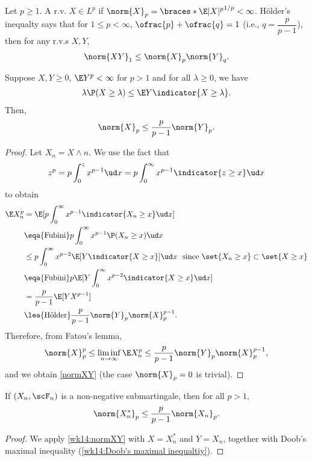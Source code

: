 \documentclass[../aipt.tex]{subfiles}
\begin{document}
Let $p\geq 1$. A r.v. $X \in L^p$ if $\norm{X}_p = \braces*{\E |X|^p}^{1/p} <\infty$. H\"older's inequalty says that for $1\leq p <\infty$, $\ofrac{p} + \ofrac{q} =1$ (i.e., $q=\dfrac{p}{p-1}$), then for any r.v.s $X, Y$, 
\begin{align*}
\norm{XY}_1 \leq \norm{X}_p\norm{Y}_q.
\end{align*}

\begin{Lemma}\label{wk14:normXY}
Suppose $X, Y\geq 0$, $\E Y^p < \infty$ for $p>1$ and for all $\lambda\geq 0$, we have
\begin{align*}
\lambda\P(X\geq\lambda) \leq \E Y\indicator{X\geq\lambda}.
\end{align*}
Then, 
\begin{align}\label{normXY}
\norm{X}_p \leq \frac{p}{p-1} \norm{Y}_p.
\end{align}
\end{Lemma}
\begin{proof}
Let $X_n = X\wedge n$. We use the fact that
\begin{align*}
z^p = p \int_0^z x^{p-1} \ud x = p \int_0^\infty x^{p-1}\indicator{z\geq x}\ud x
\end{align*}
to obtain
\begin{align*}
\E X_n^p 
&= \E[ p\int_0^\infty x^{p-1}\indicator{X_n\geq x} \ud x] \\
&\eqa{\text{Fubini}} p \int_0^\infty x^{p-1} \P(X_n\geq x) \ud x \\
&\leq p \int_0^\infty x^{p-2} \E[Y\indicator{X\geq x}] \ud x\ \text{  since $\set{X_n\geq x}\subset\set{X\geq x}$} \\
&\eqa{\text{Fubini}} p \E[Y \int_0^\infty x^{p-2}\indicator{X\geq x} \ud x] \\
&= \frac{p}{p-1} \E[YX^{p-1}] \\
&\lea{\text{H\"older}} \frac{p}{p-1} \norm{Y}_p \norm{X}_p^{p-1}. 
\end{align*}
Therefore, from Fatou's lemma,
\begin{align*}
\norm{X}_p^p \leq \liminf_{n\to\infty} \E X_n^p \leq \frac{p}{p-1} \norm{Y}_p \norm{X}_p^{p-1},
\end{align*}
and we obtain \cref{normXY} (the case $\norm{X}_p=0$ is trivial).
\end{proof}

\begin{Theorem}\label{wk14:DoobLp}
If $(X_n,\scF_n)$ is a non-negative submartingale, then for all $p>1$, 
\begin{align}
\norm{X_n^*}_p \leq \frac{p}{p-1} \norm{X_n}_p.
\end{align}
\end{Theorem}
\begin{proof}
We apply \cref{wk14:normXY} with $X=X_n^*$ and $Y=X_n$, together with Doob's maximal inequality (\cref{wk14:Doob's maximal inequaltiy}).
\end{proof}
\end{document}
